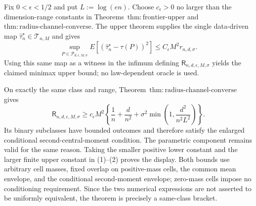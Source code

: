 Fix \(0<\epsilon<1/2\) and put \(L:=\log(en)\).  Choose \(c_\epsilon>0\) no larger than the dimension-range constants in Theorems~\(\mathrm{thm:frontier\text{-}upper}\) and \(\mathrm{thm:radius\text{-}channel\text{-}converse}\).  The upper theorem supplies the single data-driven map \(\widehat\tau_n^\star\in\mathcal T_{n,M}\) and gives
\[
 \sup_{P\in\mathcal P_{d,\epsilon,M,\sigma}}
 E[(\widehat\tau_n^\star-\tau(P))^2]
 \le C_\epsilon M^2r_{n,d,\sigma}.
\tag{1}
\]
Using this same map as a witness in the infimum defining \(\mathsf R_{n,d,\epsilon,M,\sigma}\) yields the claimed minimax upper bound; no law-dependent oracle is used.

On exactly the same class and range, Theorem~\(\mathrm{thm:radius\text{-}channel\text{-}converse}\) gives
\[
 \mathsf R_{n,d,\epsilon,M,\sigma}
 \ge c_\epsilon M^2\left\{\frac1n+\frac d{n^2}
 +\sigma^2\min\left(1,\frac{d^2}{n^2L^2}\right)\right\}.
\tag{2}
\]
Its binary subclasses have bounded outcomes and therefore satisfy the enlarged conditional second-central-moment condition.  The parametric component remains valid for the same reason.  Taking the smaller positive lower constant and the larger finite upper constant in (1)--(2) proves the display.  Both bounds use arbitrary cell masses, fixed overlap on positive-mass cells, the common mean envelope, and the conditional second-moment envelope; zero-mass cells impose no conditioning requirement.  Since the two numerical expressions are not asserted to be uniformly equivalent, the theorem is precisely a same-class bracket.